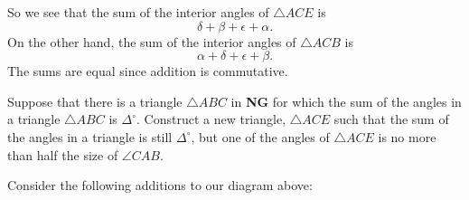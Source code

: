 \documentclass{ximera}
\begin{document}
\begin{question}
\begin{solution}
\begin{freeResponse}
\begin{image}
\end{image}
So we see that the sum of the interior angles of $\triangle ACE$ is
\[
\delta+\beta+\epsilon+\alpha.
\]
On the other hand, the sum of the interior angles of $\triangle ACB$ is 
\[
\alpha+\delta+\epsilon+\beta.
\]
The sums are equal since addition is commutative. 
\end{freeResponse}
\end{solution}
\end{question}

\begin{question}\label{22} 
Suppose that there is a triangle $\triangle ABC$ in \textbf{NG} for
which the sum of the angles in a triangle $\triangle ABC$ is
$\Delta^\circ$. Construct a new triangle, $\triangle ACE$ such that
the sum of the angles in a triangle is still $\Delta^\circ$, but one
of the angles of $\triangle ACE$ is no more than half the size of
$\angle CAB$.
\begin{image}
\end{image}


\begin{solution}
\begin{hint} Consider the following additions to our diagram above:
\begin{image}
\end{image}
\end{hint}
\end{solution}
\end{question}
\end{document}
